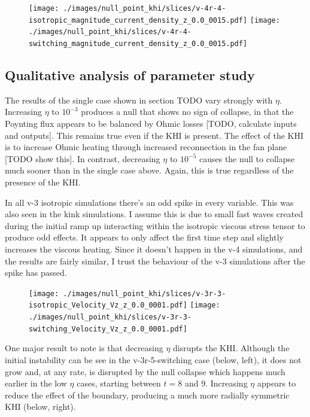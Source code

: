 \begin{figure}[H]
  \centering
  \texttt{[image: ./images/null\_point\_khi/slices/v-4r-4-isotropic\_magnitude\_current\_density\_z\_0.0\_0015.pdf]}
  \texttt{[image: ./images/null\_point\_khi/slices/v-4r-4-switching\_magnitude\_current\_density\_z\_0.0\_0015.pdf]}
\end{figure}

\subsection{Qualitative analysis of parameter study}

The results of the single case shown in section TODO vary strongly with $\eta$. Increasing $\eta$ to $10^{-3}$ produces a null that shows no sign of collapse, in that the Poynting flux appears to be balanced by Ohmic losses [TODO, calculate inputs and outputs]. This remains true even if the KHI is present. The effect of the KHI is to increase Ohmic heating through increased reconnection in the fan plane [TODO show this]. In contrast, decreasing $\eta$ to $10^{-5}$ causes the null to collapse much sooner than in the single case above. Again, this is true regardless of the presence of the KHI.

In all v-3 isotropic simulations there's an odd spike in every variable. This was also seen in the kink simulations. I assume this is due to small fast waves created during the initial ramp up interacting within the isotropic viscous stress tensor to produce odd effects. It appears to only affect the first time step and slightly increases the viscous heating. Since it doesn't happen in the v-4 simulations, and the results are fairly similar, I trust the behaviour of the v-3 simulations after the spike has passed.

\begin{figure}[H]
  \centering
  \texttt{[image: ./images/null\_point\_khi/slices/v-3r-3-isotropic\_Velocity\_Vz\_z\_0.0\_0001.pdf]}
  \texttt{[image: ./images/null\_point\_khi/slices/v-3r-3-switching\_Velocity\_Vz\_z\_0.0\_0001.pdf]}
\end{figure}

One major result to note is that decreasing $\eta$ disrupts the KHI. Although the initial instability can be see in the v-3r-5-switching case (below, left), it does not grow and, at any rate, is disrupted by the null collapse which happens much earlier in the low $\eta$ cases, starting between $t=8$ and $9$. Increasing $\eta$ appears to reduce the effect of the boundary, producing a much more radially symmetric KHI (below, right).

